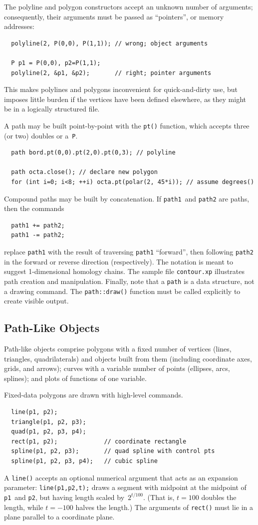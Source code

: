 \documentclass[12pt]{report}
\newcommand{\code}[1]{\texttt{#1}}
\newcommand{\filename}[1]{\texttt{#1}}
\begin{document}
The polyline and polygon constructors accept an unknown number of
arguments; consequently, their arguments must be passed as
``pointers'', or memory addresses:
\begin{verbatim}
  polyline(2, P(0,0), P(1,1)); // wrong; object arguments

  P p1 = P(0,0), p2=P(1,1);
  polyline(2, &p1, &p2);       // right; pointer arguments
\end{verbatim}
This makes polylines and polygons inconvenient for quick-and-dirty
use, but imposes little burden if the vertices have been defined
elsewhere, as they might be in a logically structured file.

A path may be built point-by-point with the \texttt{pt()} function,
which accepts three (or two) doubles or a~\texttt{P}.
\begin{verbatim}
  path bord.pt(0,0).pt(2,0).pt(0,3); // polyline

  path octa.close(); // declare new polygon
  for (int i=0; i<8; ++i) octa.pt(polar(2, 45*i)); // assume degrees()
\end{verbatim}

Compound paths may be built by concatenation. If \code{path1}~and
\code{path2} are paths, then the commands
\begin{verbatim}
  path1 += path2;
  path1 -= path2;
\end{verbatim}
replace \code{path1} with the result of traversing \code{path1}
``forward'', then following \code{path2} in the forward or reverse
direction (respectively). The notation is meant to suggest
1-dimensional homology chains. The sample file \filename{contour.xp}
illustrates path creation and manipulation.  Finally, note that a
\code{path} is a data structure, not a drawing command. The
\code{path::draw()} function must be called explicitly to create
visible output.


\subsection*{Path-Like Objects}

Path-like objects comprise polygons with a fixed number of vertices
(lines, triangles, quadrilaterals) and objects built from them
(including coordinate axes, grids, and arrows); curves with a variable
number of points (ellipses, arcs, splines); and plots of functions of
one variable.

Fixed-data polygons are drawn with high-level commands.
\begin{verbatim}
  line(p1, p2);
  triangle(p1, p2, p3);
  quad(p1, p2, p3, p4);
  rect(p1, p2);             // coordinate rectangle
  spline(p1, p2, p3);       // quad spline with control pts
  spline(p1, p2, p3, p4);   // cubic spline
\end{verbatim}
A \code{line()} accepts an optional numerical argument that acts as
an expansion parameter: \code{line(p1,p2,t);} draws a segment with
midpoint at the midpoint of \code{p1}~and \code{p2}, but having
length scaled by~$2^{t/100}$. (That is, $t=100$ doubles the length,
while $t=-100$ halves the length.) The arguments of \code{rect()}
must lie in a plane parallel to a coordinate plane.
\end{document}
